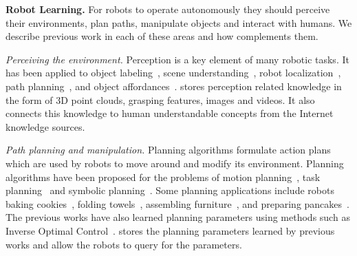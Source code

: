 

\noindent
\textbf{Robot Learning.}
For robots to operate autonomously they should perceive their environments, plan paths, manipulate objects and interact with humans. We describe previous work in each of these areas and how \robobrain{} complements them.

\noindent
\emph{Perceiving the environment.} Perception is a key element of many robotic tasks. It has been applied to object labeling~\cite{lai:icra11a, KoppulaIJRR2012,wulenzsaxena2014_hierarchicalrgbdlabeling}, scene understanding~\cite{KitaniECCV2012,guptaECCV14}, robot localization~\cite{McManus-RSS-14,NaseerAAAI14},  path planning~\cite{KatzAR14}, and object affordances~\cite{delaitre2012, KoppulaECCV14}. \robobrain{} stores perception related knowledge in the form of 3D point clouds, grasping features, images and videos. It also connects this knowledge to human understandable concepts from the Internet knowledge sources.



\noindent
\emph{Path planning and manipulation.} Planning algorithms formulate action plans which are used by robots to move around and modify its environment. Planning algorithms have been proposed for the problems of motion planning~\cite{ZuckerCHOMP13, SchulmanRSS13},  task planning~\cite{alami2006toward, BolliniISER12} and symbolic planning~\cite{edelkamp2009optimal, rintanen2012planning}. Some planning applications include robots baking cookies~\cite{BolliniISER12}, folding towels~\cite{Maitin-ShepardICRA10}, assembling furniture~\cite{KnepperICRA13}, and preparing pancakes~\cite{Beetz11}. The previous works have also learned planning parameters using methods such as Inverse Optimal Control~\citep{AbbeelIJRR10,Ratliff06,ZiebartAAAI08,jainsaxena2013_trajectorypreferences}. \robobrain{} stores the planning parameters learned by previous works and allow the robots to query for the parameters.

\iffalse
\noindent
\emph{Path and manipulation planning.} There exist a large class of algorithms which allow
robots to move around and modify the environment. Broadly planning algorithms can be
categorized as motion planning \cite{ZuckerCHOMP13, SchulmanRSS13},
 task planning \cite{alami2006toward, BolliniISER12} and symbolic planning
 \cite{edelkamp2009optimal, rintanen2012planning}.
Bakebot \cite{BolliniISER12}, towel-folding \cite{Maitin-ShepardICRA10}, IkeaBot \cite{KnepperICRA13} and robots preparing pancakes \cite{Beetz11}
are few of the many successful planning applications.
Most planning algorithms abstract out the perception details, however access to
perception and manipulation knowledge can allow robots to plan in dynamic real world environments.
\fi


